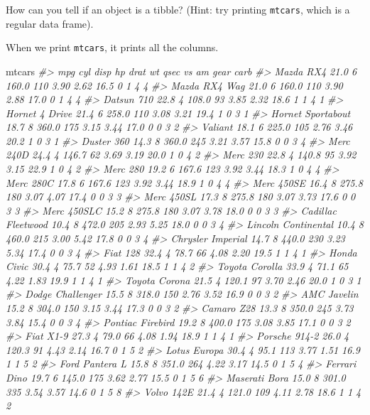 \documentclass[]{book}
\newenvironment{Shaded}{\begin{snugshade}}{\end{snugshade}}
\newcommand{\CommentTok}[1]{\textcolor[rgb]{0.56,0.35,0.01}{\textit{#1}}}
\newcommand{\NormalTok}[1]{#1}
\theoremstyle{plain}
\theoremstyle{remark}
\theoremstyle{definition}
\theoremstyle{definition}
\theoremstyle{definition}
\theoremstyle{remark}
\begin{document}
How can you tell if an object is a tibble? (Hint: try printing
\texttt{mtcars}, which is a regular data frame).

When we print \texttt{mtcars}, it prints all the columns.

\begin{Shaded}
\begin{Highlighting}[]
\NormalTok{mtcars}
\CommentTok{#>                      mpg cyl  disp  hp drat   wt qsec vs am gear carb}
\CommentTok{#> Mazda RX4           21.0   6 160.0 110 3.90 2.62 16.5  0  1    4    4}
\CommentTok{#> Mazda RX4 Wag       21.0   6 160.0 110 3.90 2.88 17.0  0  1    4    4}
\CommentTok{#> Datsun 710          22.8   4 108.0  93 3.85 2.32 18.6  1  1    4    1}
\CommentTok{#> Hornet 4 Drive      21.4   6 258.0 110 3.08 3.21 19.4  1  0    3    1}
\CommentTok{#> Hornet Sportabout   18.7   8 360.0 175 3.15 3.44 17.0  0  0    3    2}
\CommentTok{#> Valiant             18.1   6 225.0 105 2.76 3.46 20.2  1  0    3    1}
\CommentTok{#> Duster 360          14.3   8 360.0 245 3.21 3.57 15.8  0  0    3    4}
\CommentTok{#> Merc 240D           24.4   4 146.7  62 3.69 3.19 20.0  1  0    4    2}
\CommentTok{#> Merc 230            22.8   4 140.8  95 3.92 3.15 22.9  1  0    4    2}
\CommentTok{#> Merc 280            19.2   6 167.6 123 3.92 3.44 18.3  1  0    4    4}
\CommentTok{#> Merc 280C           17.8   6 167.6 123 3.92 3.44 18.9  1  0    4    4}
\CommentTok{#> Merc 450SE          16.4   8 275.8 180 3.07 4.07 17.4  0  0    3    3}
\CommentTok{#> Merc 450SL          17.3   8 275.8 180 3.07 3.73 17.6  0  0    3    3}
\CommentTok{#> Merc 450SLC         15.2   8 275.8 180 3.07 3.78 18.0  0  0    3    3}
\CommentTok{#> Cadillac Fleetwood  10.4   8 472.0 205 2.93 5.25 18.0  0  0    3    4}
\CommentTok{#> Lincoln Continental 10.4   8 460.0 215 3.00 5.42 17.8  0  0    3    4}
\CommentTok{#> Chrysler Imperial   14.7   8 440.0 230 3.23 5.34 17.4  0  0    3    4}
\CommentTok{#> Fiat 128            32.4   4  78.7  66 4.08 2.20 19.5  1  1    4    1}
\CommentTok{#> Honda Civic         30.4   4  75.7  52 4.93 1.61 18.5  1  1    4    2}
\CommentTok{#> Toyota Corolla      33.9   4  71.1  65 4.22 1.83 19.9  1  1    4    1}
\CommentTok{#> Toyota Corona       21.5   4 120.1  97 3.70 2.46 20.0  1  0    3    1}
\CommentTok{#> Dodge Challenger    15.5   8 318.0 150 2.76 3.52 16.9  0  0    3    2}
\CommentTok{#> AMC Javelin         15.2   8 304.0 150 3.15 3.44 17.3  0  0    3    2}
\CommentTok{#> Camaro Z28          13.3   8 350.0 245 3.73 3.84 15.4  0  0    3    4}
\CommentTok{#> Pontiac Firebird    19.2   8 400.0 175 3.08 3.85 17.1  0  0    3    2}
\CommentTok{#> Fiat X1-9           27.3   4  79.0  66 4.08 1.94 18.9  1  1    4    1}
\CommentTok{#> Porsche 914-2       26.0   4 120.3  91 4.43 2.14 16.7  0  1    5    2}
\CommentTok{#> Lotus Europa        30.4   4  95.1 113 3.77 1.51 16.9  1  1    5    2}
\CommentTok{#> Ford Pantera L      15.8   8 351.0 264 4.22 3.17 14.5  0  1    5    4}
\CommentTok{#> Ferrari Dino        19.7   6 145.0 175 3.62 2.77 15.5  0  1    5    6}
\CommentTok{#> Maserati Bora       15.0   8 301.0 335 3.54 3.57 14.6  0  1    5    8}
\CommentTok{#> Volvo 142E          21.4   4 121.0 109 4.11 2.78 18.6  1  1    4    2}
\end{Highlighting}
\end{Shaded}
\end{document}
